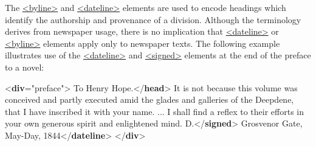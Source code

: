 The \hyperref[TEI.byline]{<byline>} and \hyperref[TEI.dateline]{<dateline>} elements are used to encode headings which identify the authorship and provenance of a division. Although the terminology derives from newspaper usage, there is no implication that \hyperref[TEI.dateline]{<dateline>} or \hyperref[TEI.byline]{<byline>} elements apply only to newspaper texts. The following example illustrates use of the \hyperref[TEI.dateline]{<dateline>} and \hyperref[TEI.signed]{<signed>} elements at the end of the preface to a novel: \par\bgroup{}\exampleFont \begin{shaded}\noindent\mbox{}{<\textbf{div}\hspace*{1em}{type}="{preface}">}\mbox{}\newline 
{}To Henry Hope.{</\textbf{head}>}\mbox{}\newline 
{}It is not because this volume was conceived and partly\mbox{}\newline 
\hspace*{1em}\hspace*{1em} executed amid the glades and galleries of the Deepdene,\mbox{}\newline 
\hspace*{1em}\hspace*{1em} that I have inscribed it with your name. ... I shall find a\mbox{}\newline 
\hspace*{1em}\hspace*{1em} reflex to their efforts in your own generous spirit and\mbox{}\newline 
\hspace*{1em}\hspace*{1em} enlightened mind.\mbox{}\newline 
{}\mbox{}\newline 
{}\mbox{}\newline 
\hspace*{1em}D.{</\textbf{signed}>}\mbox{}\newline 
\hspace*{1em}Grosvenor Gate, May-Day, 1844{</\textbf{dateline}>}\mbox{}\newline 
{}\mbox{}\newline 
{</\textbf{div}>}\end{shaded}\egroup\par \noindent  \par
